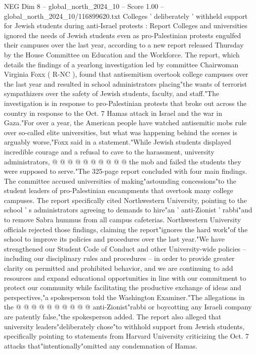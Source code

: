 \begin{textsample}{NEG Dim 8 – global\_north\_2024\_10 – Score 1.00 – global\_north\_2024\_10/116899620.txt}  \label{ex:f8_neg_205}
Colleges ' deliberately ' withheld support for Jewish students during anti-Israel protests : Report Colleges and universities ignored the needs of Jewish students even as pro-Palestinian protests engulfed their campuses over the last year, according to a new report released Thursday by the House Committee on Education and the Workforce.
The report, which details the findings of a yearlong investigation led by committee Chairwoman Virginia Foxx ( R-NC ), found that antisemitism overtook college campuses over the last year and resulted in school administrators placing"the wants of terrorist sympathizers over the safety of Jewish students, faculty, and staff."The investigation is in response to pro-Palestinian protests that broke out across the country in response to the Oct. 7 Hamas attack in Israel and the war in Gaza."For over a year, the American people have watched antisemitic mobs rule over so-called elite universities, but what was happening behind the scenes is arguably worse,"Foxx said in a statement."While Jewish students displayed incredible courage and a refusal to cave to the harassment, university administrators, @ @ @ @ @ @ @ @ @ @ the mob and failed the students they were supposed to serve."The 325-page report concluded with four main findings.
The committee accused universities of making"astounding concessions"to the student leaders of pro-Palestinian encampments that overtook many college campuses.
The report specifically cited Northwestern University, pointing to the school ' s administrators agreeing to demands to hire"an ' anti-Zionist ' rabbi"and to remove Sabra hummus from all campus cafeterias.
Northwestern University officials rejected those findings, claiming the report"ignores the hard work"of the school to improve its policies and procedures over the last year."We have strengthened our Student Code of Conduct and other University-wide policies -- including our disciplinary rules and procedures -- in order to provide greater clarity on permitted and prohibited behavior, and we are continuing to add resources and expand educational opportunities in line with our commitment to protect our community while facilitating the productive exchange of ideas and perspectives,"a spokesperson told the Washington Examiner."The allegations in the @ @ @ @ @ @ @ @ @ @ anti-Zionist"rabbi or boycotting any Israeli company are patently false,"the spokesperson added.
The report also alleged that university leaders"deliberately chose"to withhold support from Jewish students, specifically pointing to statements from Harvard University criticizing the Oct. 7 attacks that"intentionally"omitted any condemnation of Hamas.

\end{textsample}
